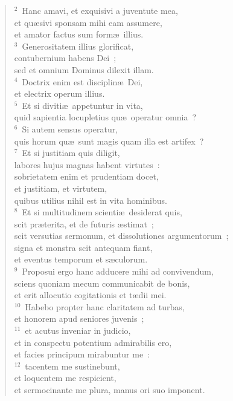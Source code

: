 \begin{verse}${}^{2}$~Hanc amavi, et exquisivi a juventute mea,\\ et qu\ae sivi sponsam mihi eam assumere,\\ et amator factus sum form\ae\ illius.\\
${}^{3}$~Generositatem illius glorificat,\\ contubernium habens Dei~;\\ sed et omnium Dominus dilexit illam.\\
${}^{4}$~Doctrix enim est disciplin\ae\ Dei,\\ et electrix operum illius.\\
${}^{5}$~Et si diviti\ae\ appetuntur in vita,\\ quid sapientia locupletius qu\ae\ operatur omnia~?\\
${}^{6}$~Si autem sensus operatur,\\ quis horum qu\ae\ sunt magis quam illa est artifex~?\\
${}^{7}$~Et si justitiam quis diligit,\\ labores hujus magnas habent virtutes~:\\ sobrietatem enim et prudentiam docet,\\ et justitiam, et virtutem,\\ quibus utilius nihil est in vita hominibus.\\
${}^{8}$~Et si multitudinem scienti\ae\ desiderat quis,\\ scit pr\ae terita, et de futuris \ae stimat~;\\ scit versutias sermonum, et dissolutiones argumentorum~;\\ signa et monstra scit antequam fiant,\\ et eventus temporum et s\ae culorum.\\
${}^{9}$~Proposui ergo hanc adducere mihi ad convivendum,\\ sciens quoniam mecum communicabit de bonis,\\ et erit allocutio cogitationis et t\ae dii mei.\\
${}^{10}$~Habebo propter hanc claritatem ad turbas,\\ et honorem apud seniores juvenis~;\\
${}^{11}$~et acutus inveniar in judicio,\\ et in conspectu potentium admirabilis ero,\\ et facies principum mirabuntur me~:\\
${}^{12}$~tacentem me sustinebunt,\\ et loquentem me respicient,\\ et sermocinante me plura, manus ori suo imponent.\\

\end{verse}

